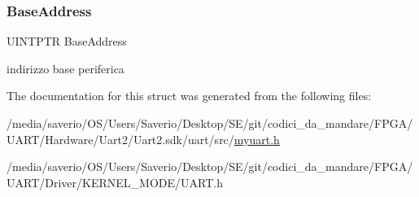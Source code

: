 \subsubsection{\texorpdfstring{Base\+Address}{BaseAddress}}
{\footnotesize\ttfamily U\+I\+N\+T\+P\+TR Base\+Address}

indirizzo base periferica 

The documentation for this struct was generated from the following files\+:\begin{DoxyCompactItemize}
\item 
/media/saverio/\+O\+S/\+Users/\+Saverio/\+Desktop/\+S\+E/git/codici\+\_\+da\+\_\+mandare/\+F\+P\+G\+A/\+U\+A\+R\+T/\+Hardware/\+Uart2/\+Uart2.\+sdk/uart/src/\hyperlink{myuart_8h}{myuart.\+h}\item 
/media/saverio/\+O\+S/\+Users/\+Saverio/\+Desktop/\+S\+E/git/codici\+\_\+da\+\_\+mandare/\+F\+P\+G\+A/\+U\+A\+R\+T/\+Driver/\+K\+E\+R\+N\+E\+L\+\_\+\+M\+O\+D\+E/U\+A\+R\+T.\+h\end{DoxyCompactItemize}
